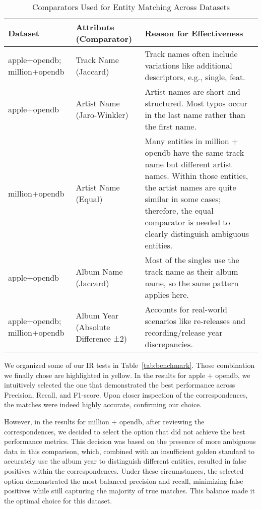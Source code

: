 \documentclass[runningheads]{llncs}
\begin{document}
\setlength{\tabcolsep}{4pt} %
\renewcommand{\arraystretch}{1.5} %
\begin{table}[ht]
	\centering
	\caption{Comparators Used for Entity Matching Across Datasets}
	\label{tab:comparators}
	\begin{tabular}{p{2.5cm}p{2.5cm}p{6cm}}
	\hline
	\textbf{Dataset}      & \textbf{Attribute (Comparator)}            & \textbf{Reason for Effectiveness}                                                                                      \\ \hline
	apple+opendb; million+opendb & \raggedright Track Name (Jaccard)              & Track names often include variations like additional descriptors, e.g., single, feat.                                  \\ \hline
	apple+opendb                  & \raggedright Artist Name (Jaro-Winkler)                  & Artist names are short and structured. Most typos occur in the last name rather than the first name.                    \\ \hline
	million+opendb                & \raggedright Artist Name (Equal)                          & Many entities in million + opendb have the same track name but different artist names. Within those entities, the artist names are quite similar in some cases; therefore, the equal comparator is needed to clearly distinguish ambiguous entities. \\ \hline
	apple+opendb                  & \raggedright Album Name (Jaccard)              & Most of the singles use the track name as their album name, so the same pattern applies here.                           \\ \hline
	apple+opendb; million+opendb & \raggedright Album Year (Absolute Difference ±2)       & Accounts for real-world scenarios like re-releases and recording/release year discrepancies.                            \\ \hline
	\end{tabular}
	\end{table}

	We organized some of our IR tests in Table~\ref{tab:benchmark}. Those combination we finally chose are highlighted in yellow. In the results for apple + opendb, we intuitively selected the one that demonstrated the best performance across Precision, Recall, and F1-score. Upon closer inspection of the correspondences, the matches were indeed highly accurate, confirming our choice.

	However, in the results for million + opendb, after reviewing the correspondences, we decided to select the option that did not achieve the best performance metrics. This decision was based on the presence of more ambiguous data in this comparison, which, combined with an insufficient golden standard to accurately use the album year to distinguish different entities, resulted in false positives within the correspondences. Under these circumstances, the selected option demonstrated the most balanced precision and recall, minimizing false positives while still capturing the majority of true matches. This balance made it the optimal choice for this dataset.
\end{document}
